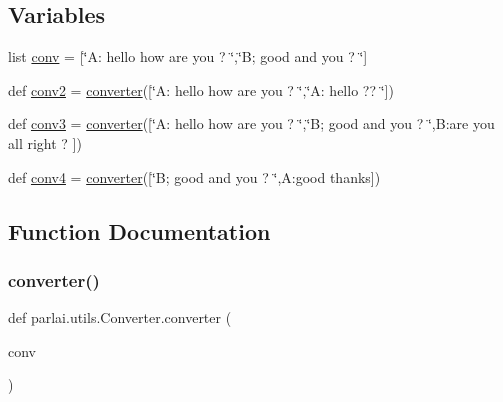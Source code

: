 \subsection*{Variables}
\begin{DoxyCompactItemize}
\item 
list \hyperlink{namespaceparlai_1_1utils_1_1Converter_a13cb8defe67113796a6361ac8ddf7dc3}{conv} = \mbox{[}\char`\"{}A\+: hello how are you ? \char`\"{},\char`\"{}B; good and you ? \char`\"{}\mbox{]}
\item 
def \hyperlink{namespaceparlai_1_1utils_1_1Converter_aaa6b0bc891abc4046a0b6fea89f111a9}{conv2} = \hyperlink{namespaceparlai_1_1utils_1_1Converter_abd079f987382596057ec8c630fa3db8c}{converter}(\mbox{[}\char`\"{}A\+: hello how are you ? \char`\"{},\char`\"{}A\+: hello ?? \char`\"{}\mbox{]})
\item 
def \hyperlink{namespaceparlai_1_1utils_1_1Converter_a2f2206cd164b65b49761dd286d53b1c7}{conv3} = \hyperlink{namespaceparlai_1_1utils_1_1Converter_abd079f987382596057ec8c630fa3db8c}{converter}(\mbox{[}\char`\"{}A\+: hello how are you ? \char`\"{},\char`\"{}B; good and you ? \char`\"{},\textquotesingle{}B\+:are you all right ? \textquotesingle{}\mbox{]})
\item 
def \hyperlink{namespaceparlai_1_1utils_1_1Converter_a7d751305c00c3e74467fe993c35112c5}{conv4} = \hyperlink{namespaceparlai_1_1utils_1_1Converter_abd079f987382596057ec8c630fa3db8c}{converter}(\mbox{[}\char`\"{}B; good and you ? \char`\"{},\textquotesingle{}A\+:good thanks\textquotesingle{}\mbox{]})
\end{DoxyCompactItemize}


\subsection{Function Documentation}
\mbox{\label{namespaceparlai_1_1utils_1_1Converter_abd079f987382596057ec8c630fa3db8c}} 
\subsubsection{\texorpdfstring{converter()}{converter()}}
{\footnotesize\ttfamily def parlai.\+utils.\+Converter.\+converter (\begin{DoxyParamCaption}\item[{}]{conv }\end{DoxyParamCaption})}

